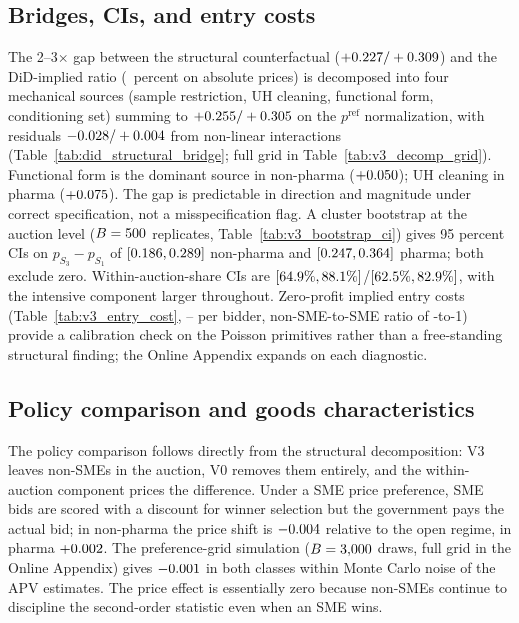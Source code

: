 \subsection{Bridges, CIs, and entry costs}\label{sec:bridge}

The 2--3$\times$ gap between the structural counterfactual ($+0.227/+0.309$) and the DiD-implied ratio (\didImpliedRatio~percent on absolute prices) is decomposed into four mechanical sources (sample restriction, UH cleaning, functional form, conditioning set) summing to $+0.255/+0.305$ on the $p^{\mathrm{ref}}$ normalization, with residuals $-0.028/+0.004$ from non-linear interactions (Table~\ref{tab:did_structural_bridge}; full grid in Table~\ref{tab:v3_decomp_grid}). Functional form is the dominant source in non-pharma ($+0.050$); UH cleaning in pharma ($+0.075$). The gap is predictable in direction and magnitude under correct specification, not a misspecification flag. A cluster bootstrap at the auction level ($B = 500$ replicates, Table~\ref{tab:v3_bootstrap_ci}) gives 95 percent CIs on $p_{S_3} - p_{S_1}$ of $[0.186, 0.289]$ non-pharma and $[0.247, 0.364]$ pharma; both exclude zero. Within-auction-share CIs are $[64.9\%, 88.1\%]$/$[62.5\%, 82.9\%]$, with the intensive component larger throughout. Zero-profit implied entry costs (Table~\ref{tab:v3_entry_cost}, \entryCostMin--\entryCostMax{} per bidder, non-SME-to-SME ratio of \entryCostRatioNp-to-1) provide a calibration check on the Poisson primitives rather than a free-standing structural finding; the Online Appendix expands on each diagnostic.

\subsection{Policy comparison and goods characteristics}\label{sec:pareto}

The policy comparison follows directly from the structural decomposition: V3 leaves non-SMEs in the auction, V0 removes them entirely, and the within-auction component prices the difference. Under a \optPrefThreshold{} SME price preference, SME bids are scored with a \optPrefThreshold{} discount for winner selection but the government pays the actual bid; in non-pharma the price shift is $-0.004$ relative to the open regime, in pharma $+0.002$. The preference-grid simulation ($B = 3{,}000$ draws, full grid in the Online Appendix) gives $-0.001$ in both classes within Monte Carlo noise of the APV estimates. The price effect is essentially zero because non-SMEs continue to discipline the second-order statistic even when an SME wins.

